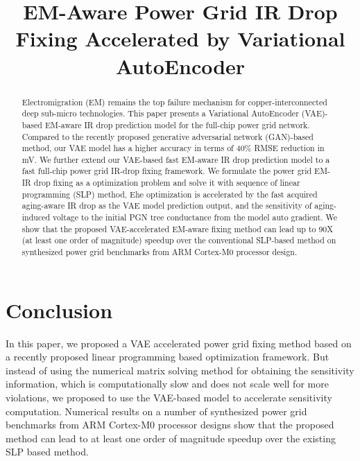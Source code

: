 \documentclass[journal]{IEEEtran}
\begin{document}
\title{ EM-Aware Power Grid IR Drop Fixing Accelerated by Variational AutoEncoder}



\maketitle
  
\begin{abstract}
Electromigration (EM) remains the top failure mechanism for copper-interconnected deep sub-micro technologies. 
This paper presents a Variational AutoEncoder (VAE)-based EM-aware IR drop prediction model for the full-chip power grid network.
Compared to the recently proposed generative adversarial network (GAN)-based method, our VAE model has a higher accuracy in terms of 40$\%$ RMSE reduction in mV.
We further extend our VAE-based fast EM-aware IR drop prediction model to a fast full-chip power grid IR-drop fixing framework.
We formulate the power grid EM-IR drop fixing as a optimization problem and solve it with sequence of linear programming (SLP) method, 
Ehe optimization is accelerated by the fast acquired aging-aware IR drop as the VAE model prediction output, and the sensitivity of aging-induced voltage to the initial PGN tree conductance from the model auto gradient. 
We show that the proposed VAE-accelerated EM-aware fixing method can lead up to 90X (at least one order of magnitude) speedup over the conventional SLP-based method on synthesized power grid benchmarks from ARM Cortex-M0 processor design.



\end{abstract}
 








\section{Conclusion}
\label{sec:conclusion}
In this paper, we proposed a VAE accelerated power grid
fixing method based on a recently proposed linear programming based
optimization framework.  But instead of using the numerical matrix
solving method for obtaining the sensitivity information, which is
computationally slow and does not scale well for more violations, we
proposed to use the VAE-based model to accelerate sensitivity
computation.  Numerical results on a number of synthesized power grid
benchmarks from ARM Cortex-M0 processor designs show that the proposed
method can lead to at least one order of magnitude speedup over the
existing SLP based method. 
\end{document}
